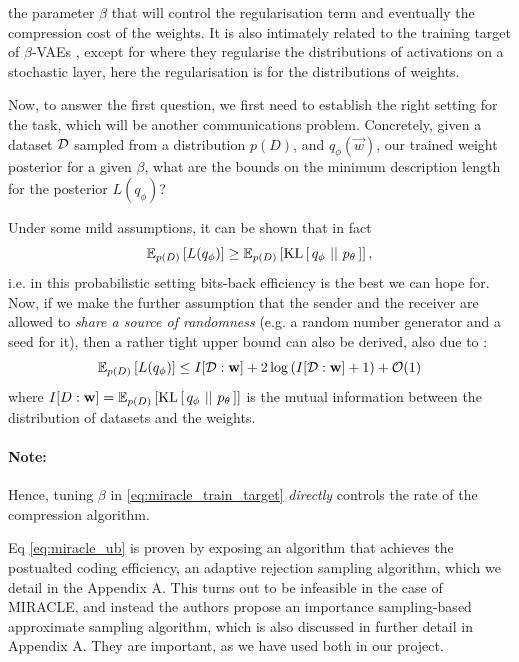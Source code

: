 the parameter $\beta$ that will control the regularisation term and eventually
the compression cost of the weights. It is also intimately related to the
training target of $\beta$-VAEs \cite{higgins2017beta}, except for where they
regularise the distributions of activations on a stochastic layer, here the
regularisation is for the distributions of weights. 
\par
Now, to answer the first question, we first need to establish the right setting
for the task, which will be another communications problem.
Concretely, given a dataset $\Data$ sampled from a distribution $p(D)$, and
$q_\phi(\vec{w})$, our trained weight posterior for a given $\beta$, what are
the bounds on the minimum description length for the posterior $L(q_{\phi})$?
\par
Under some mild assumptions, it can be shown \cite{harsha2007communication} that
in fact
\[
  \Exp{L(q_{\phi})}{p(D)} \geq \Exp{\KL{q_{\phi}}{p_{\theta}}}{p(D)},
\]
i.e. in this probabilistic setting bits-back efficiency is the best we can hope
for. Now, if we make the further assumption that the sender and the receiver are
allowed to \textit{share a source of randomness} (e.g. a random number generator
and a seed for it), then a rather tight upper bound can also be derived, also
due to \cite{harsha2007communication}:
\begin{equation}
\label{eq:miracle_ub}
  \Exp{L(q_{\phi})}{p(D)} \leq I[\Data : \vec{w}] + 2 \log \left( I[\Data :
    \vec{w}] + 1 \right) + \Oh(1)
\end{equation}
where $I[D : \vec{w}] = \Exp{\KL{q_{\phi}}{p_{\theta}}}{p(D)}$ is the
mutual information between the distribution of datasets and the weights.
\paragraph{Note:} Hence, tuning $\beta$ in \ref{eq:miracle_train_target}
\textit{directly} controls the rate of the compression algorithm.
\par
Eq \ref{eq:miracle_ub} is proven by exposing an algorithm that achieves the
postualted coding efficiency, an adaptive rejection sampling algorithm, which we
detail in the Appendix A. This turns out to be infeasible in the case of
MIRACLE, and instead the authors propose an importance sampling-based
approximate sampling algorithm, which is also discussed in further detail in
Appendix A. They are important, as we have used both in our project.


